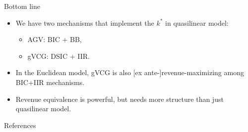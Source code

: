 \documentclass[english,10pt
,aspectratio=169
]{beamer}
\begin{document}
\begin{frame}{Bottom line}
\begin{itemize}
	\item We have two mechanisms that implement the  $k^*$ in \alert{quasilinear} model:
	\begin{itemize}
		\item AGV: BIC + BB,
		\item gVCG: DSIC + IIR.
	\end{itemize}
	\item In the \alert{Euclidean} model, gVCG is also [ex ante-]revenue-maximizing among BIC+IIR mechanisms.
	\item Revenue equivalence is powerful, but needs more structure than just quasilinear model.
\end{itemize}
\end{frame}


\appendix
\begin{frame}[allowframebreaks]{References}


\end{frame}







\end{document}
